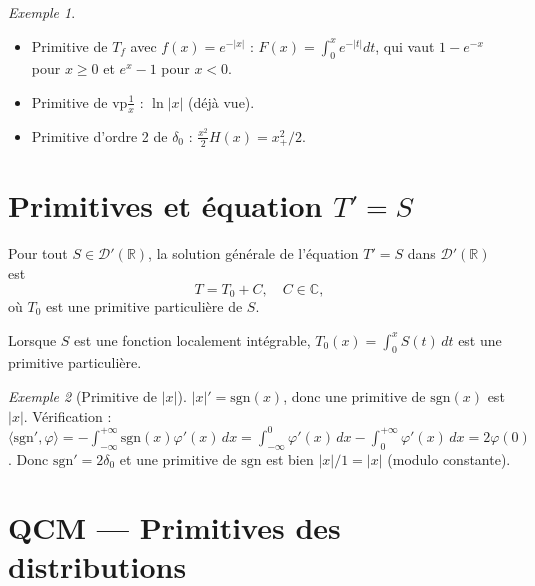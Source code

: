 \documentclass[12pt,a4paper,openany]{book}
\theoremstyle{definition}
\theoremstyle{plain}
\theoremstyle{remark}
\newtheorem*{example}{Exemple}
\newenvironment{exemple}{\begin{example}}{\end{example}}
\begin{document}
	\begin{exemple}
		\begin{itemize}
			\item Primitive de $T_f$ avec $f(x) = e^{-|x|}$ : $F(x) = \int_0^x e^{-|t|}dt$, qui vaut $1 - e^{-x}$ pour $x \geq 0$ et $e^x - 1$ pour $x < 0$.
			\item Primitive de $\mathrm{vp}\frac{1}{x}$ : $\ln|x|$ (déjà vue).
			\item Primitive d'ordre 2 de $\delta_0$ : $\frac{x^2}{2}H(x) = x_+^2/2$.
		\end{itemize}
	\end{exemple}
	
	\section{Primitives et équation \texorpdfstring{$T' = S$}{T'=S}}
	
	\begin{theorem}[Résolution de $T' = S$]
		Pour tout $S \in \mathcal{D}'(\mathbb{R})$, la solution générale de l'équation $T' = S$ dans $\mathcal{D}'(\mathbb{R})$ est
		\[
		T = T_0 + C, \quad C \in \mathbb{C},
		\]
		où $T_0$ est une primitive particulière de $S$.
		
		Lorsque $S$ est une fonction localement intégrable, $T_0(x) = \int_0^x S(t)\,dt$ est une primitive particulière.
	\end{theorem}
	
	\begin{exemple}[Primitive de $|x|$]
		$|x|' = \mathrm{sgn}(x)$, donc une primitive de $\mathrm{sgn}(x)$ est $|x|$.
		Vérification : $\langle \mathrm{sgn}', \varphi\rangle = -\int_{-\infty}^{+\infty}\mathrm{sgn}(x)\varphi'(x)\,dx = \int_{-\infty}^0\varphi'(x)\,dx - \int_0^{+\infty}\varphi'(x)\,dx = 2\varphi(0)$.
		Donc $\mathrm{sgn}'= 2\delta_0$ et une primitive de $\mathrm{sgn}$ est bien $|x|/1 = |x|$ (modulo constante).
	\end{exemple}
	
	\section{QCM — Primitives des distributions}
	
\end{document}
